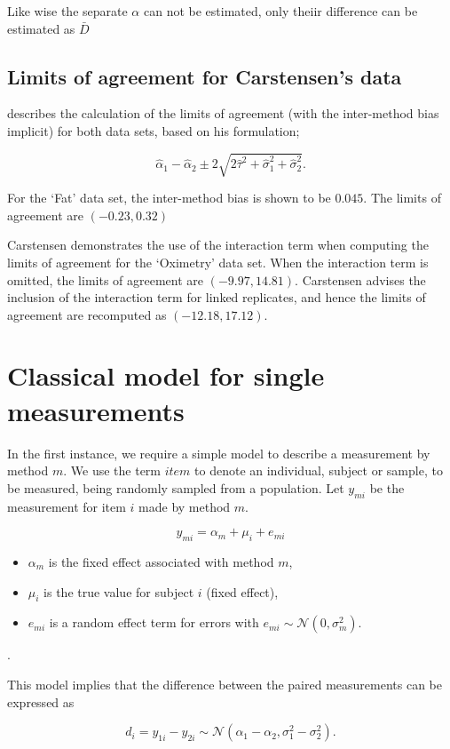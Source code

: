 \documentclass[12pt, a4paper]{report}
\theoremstyle{plain}
\theoremstyle{definition}
\theoremstyle{remark}
\begin{document}
Like wise the separate $\alpha$ can not be
estimated, only theiir difference can be estimated as
$\bar{D}$


\subsection{Limits of agreement for Carstensen's data}


\citet{BXC2008} describes the calculation of the limits of agreement (with the inter-method bias implicit) for both data sets, based on his formulation;

\[\hat{\alpha}_1 - \hat{\alpha}_2 \pm 2\sqrt{2\hat{\tau}^2 +\hat{\sigma}_1^2 +\hat{\sigma}_2^2 }.\]

For the `Fat' data set, the inter-method bias is shown to be $0.045$. The limits of agreement are $(-0.23 , 0.32)$

Carstensen demonstrates the use of the interaction term when computing the limits of agreement for the `Oximetry' data set. When the interaction term is omitted, the limits of agreement are $(-9.97, 14.81)$. Carstensen advises the inclusion of the interaction term for linked replicates, and hence the limits of agreement are recomputed as $(-12.18,17.12)$.

\section{Classical model for single measurements}
In the first instance, we require a simple model to describe a measurement by method $m$. We use the term $item$ to denote an individual, subject or sample, to be measured, being randomly sampled from a population. Let $y_{mi}$ be the measurement for item $i$ made by method $m$.

\[ y_{mi} = \alpha_{m} + \mu_{i} + e_{mi}  \]

\begin{itemize}
	\item $\alpha_m$ is the fixed effect associated with method $m$,
	\item $\mu_i$ is the true value for subject $i$ (fixed effect),
	\item $e_{mi}$ is a
	random effect term for errors with $e_{mi}  \sim \mathcal{N}(0,\sigma^2_m)$. \end{itemize}.

This model implies that the difference between the paired measurements can be expressed as

\[ d_{i} = y_{1i} - y_{2i} \sim \mathcal{N} (\alpha_{1} - \alpha_{2}, \sigma^2_{1} - \sigma^2_{2}). \]
\end{document}

